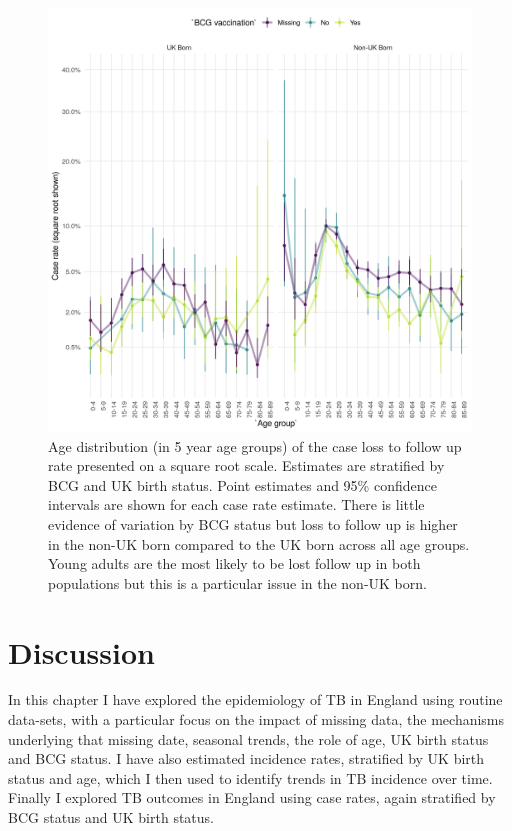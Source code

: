 \documentclass[11pt,twoside]{bristolthesis}
\begin{document}
  \begin{figure}
  
  {\centering \includegraphics[width=0.8\linewidth,]{chapters/tb-epi-england/figures/plot-loss-fol-age-dist} 
  
  }
  
  \caption[Age distribution (in 5 year age groups) of the case loss to follow up rate presented on a square root scale.]{Age distribution (in 5 year age groups) of the case loss to follow up rate presented on a square root scale. Estimates are stratified by BCG and UK birth status. Point estimates and 95\%  confidence intervals are shown for each case rate estimate. There is little evidence of variation by BCG status but loss to follow up is higher in the non-UK born compared to the UK born across all age groups. Young adults are the most likely to be lost follow up in both populations but this is a particular issue in the non-UK born.}\label{fig:plot-loss-fol-age-dist}
  \end{figure}
  \hypertarget{discussion-1}{%
  \section{Discussion}\label{discussion-1}}
  
  In this chapter I have explored the epidemiology of TB in England using routine data-sets, with a particular focus on the impact of missing data, the mechanisms underlying that missing date, seasonal trends, the role of age, UK birth status and BCG status. I have also estimated incidence rates, stratified by UK birth status and age, which I then used to identify trends in TB incidence over time. Finally I explored TB outcomes in England using case rates, again stratified by BCG status and UK birth status.
  
\end{document}
